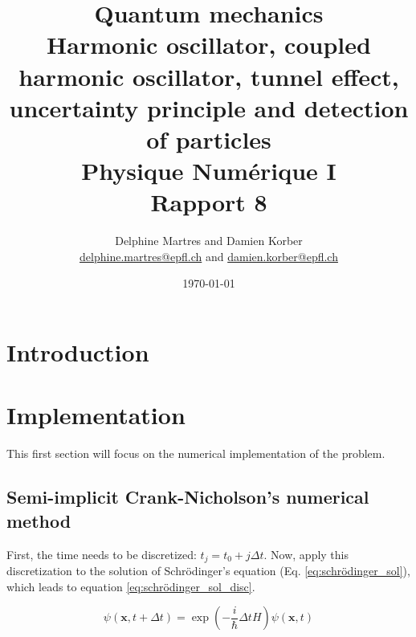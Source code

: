 \documentclass[a4paper,12pt,twoside]{article}
\newcommand{\mail}[1]{{\href{mailto:#1}{#1}}}
\newcommand{\mbf}[1]{\mathbf{#1}} %
\newcommand{\bracket}[1]{\left(#1\right)}
\begin{document}
\title{Quantum mechanics\\{\normalsize Harmonic oscillator, coupled harmonic oscillator, tunnel effect, uncertainty principle and detection of particles}\\{\small Physique Numérique I}\\{\small Rapport 8}}
\date{\today}
\author{Delphine Martres and Damien Korber\\{\small \mail{delphine.martres@epfl.ch} and \mail{damien.korber@epfl.ch}}}

\maketitle
\tableofcontents %


\baselineskip=16pt
\parindent=15pt
\parskip=5pt
\newpage


\section{Introduction}

\section{Implementation}\label{sec:impl}
  This first section will focus on the numerical implementation of the problem.

  \subsection{Semi-implicit Crank-Nicholson's numerical method}
    First, the time needs to be discretized: $t_j = t_0 + j\Delta t$.
    Now, apply this discretization to the solution of Schrödinger's equation (Eq. \eqref{eq:schrödinger_sol}), which leads to equation \eqref{eq:schrödinger_sol_disc}.

    \begin{equation}
      \psi(\mbf{x}, t + \Delta t) = \exp\bracket{-\frac{i}{\hbar}\Delta t H}\psi(\mbf{x}, t)
      \label{eq:schrödinger_sol_disc}
    \end{equation}
\end{document}
